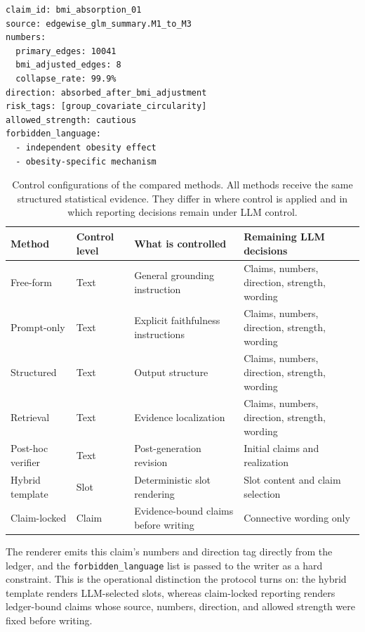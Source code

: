 \documentclass[10pt,twocolumn]{article}
\begin{document}
\begin{Verbatim}[fontsize=\scriptsize,breaklines=true,breakanywhere=true]
claim_id: bmi_absorption_01
source: edgewise_glm_summary.M1_to_M3
numbers:
  primary_edges: 10041
  bmi_adjusted_edges: 8
  collapse_rate: 99.9%
direction: absorbed_after_bmi_adjustment
risk_tags: [group_covariate_circularity]
allowed_strength: cautious
forbidden_language:
  - independent obesity effect
  - obesity-specific mechanism
\end{Verbatim}
\begin{table}[t]
	\caption{Control configurations of the compared methods. All methods receive the same structured statistical evidence. They differ in where control is applied and in which reporting decisions remain under LLM control.}
	\label{tab:baseline-controls}
	\centering
	\footnotesize
	\setlength{\tabcolsep}{6pt}
	\begin{tabular}{llll}
		\toprule
		Method & Control level & What is controlled & Remaining LLM decisions \\
		\midrule
		Free-form
		& Text
		& General grounding instruction
		& Claims, numbers, direction, strength, wording \\
		
		Prompt-only
		& Text
		& Explicit faithfulness instructions
		& Claims, numbers, direction, strength, wording \\
		
		Structured
		& Text
		& Output structure
		& Claims, numbers, direction, strength, wording \\
		
		Retrieval
		& Text
		& Evidence localization
		& Claims, numbers, direction, strength, wording \\
		
		Post-hoc verifier
		& Text
		& Post-generation revision
		& Initial claims and realization \\
		
		Hybrid template
		& Slot
		& Deterministic slot rendering
		& Slot content and claim selection \\
		
		Claim-locked
		& Claim
		& Evidence-bound claims before writing
		& Connective wording only \\
		\bottomrule
	\end{tabular}
\end{table}
The renderer emits this claim's numbers and direction tag directly from the ledger, and the \texttt{forbidden\_language} list is passed to the writer as a hard constraint. This is the operational distinction the protocol turns on: the hybrid template renders LLM-selected slots, whereas claim-locked reporting renders ledger-bound claims whose source, numbers, direction, and allowed strength were fixed before writing.
\end{document}
